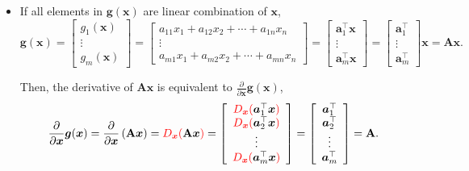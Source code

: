 \documentclass[12pt,thmsa]{article}
\begin{document}
\begin{itemize}
	\item If all elements in \(\boldsymbol{g}( \boldsymbol{x} )\) are linear combination of \(\boldsymbol{x}\),
	\[ \boldsymbol{g}( \boldsymbol{x} )
	=\left[
	\begin{array}{c}{
			g_{1}(\boldsymbol{x})} \\ 
		{\vdots} \\ 
		{g_{m}(\boldsymbol{x})}
	\end{array}
	\right]
	=\left[
	\begin{array}{c}{
			a_{11} x_{1}+a_{12} x_{2}+\cdots+a_{1 n} x_{n}} \\ 
		{\vdots} \\ 
		{a_{m 1} x_{1}+a_{m 2} x_{2}+\cdots+a_{m n} x_{n}}
	\end{array}
	\right]
	=\left[
	\begin{array}{c}{
			\boldsymbol{a}_{1}^{\top} \boldsymbol{x}} \\ 
		{\vdots} \\ 
		{\boldsymbol{a}_{m}^{\top}\boldsymbol{x}}
	\end{array}
	\right]
	=\left[
	\begin{array}{c}{\boldsymbol{a}_{1}^{\top}} \\ {\vdots} \\ {\boldsymbol{a}_{m}^{\top}}\end{array}
	\right] \boldsymbol{x}
	= \mathbf{A} \boldsymbol{x}.
	\]
	
	Then, the derivative of \(\mathbf{A} \boldsymbol{x}\) is equivalent to \(\frac{\partial}{\partial \boldsymbol{x}} \boldsymbol{g}( \boldsymbol{x} ) \),
	\[ \frac{\partial}{\partial \boldsymbol{x}} \boldsymbol{g}( \boldsymbol{x} )
	= \frac{\partial}{\partial \boldsymbol{x}} \left(  \mathbf{A} \boldsymbol{x} \right)
	= {\color{red}{ D_{\boldsymbol{x}}( }} \mathbf{A} \boldsymbol{x} {\color{red}{ ) }} 
	= \left[
		\begin{array}{c}
			{\color{red}{D_{\boldsymbol{x}}(}}{ \boldsymbol{a}_{1}^{\top} \boldsymbol{x} }{\color{red})} \\
			{\color{red}{D_{\boldsymbol{x}}(}}{ \boldsymbol{a}_{2}^{\top} \boldsymbol{x} }{\color{red})} \\
			\vdots \\
			{\color{red}{D_{\boldsymbol{x}}(}}{ \boldsymbol{a}_{m}^{\top} \boldsymbol{x} }{\color{red})}
		\end{array}
		\right]
	= \left[
		\begin{array}{c}
			\boldsymbol{a}_{1}^{\top}\\
			\boldsymbol{a}_{2}^{\top}\\
			\vdots \\
			\boldsymbol{a}_{m}^{\top}
		\end{array}
		\right]
	= \mathbf{A}.
	\]
	

\end{itemize}
\end{document}
